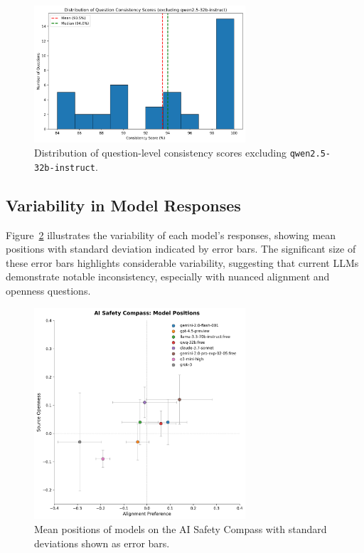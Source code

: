 \begin{figure}[htbp]
    \centering
    \includegraphics[width=0.7\textwidth]{figures/histogram_question_consistency_excludingqwen2.5-32b-instruct.png}
    \caption{Distribution of question-level consistency scores excluding \texttt{qwen2.5-32b-instruct}.}
    \label{fig:question_consistency}
\end{figure}

\subsection{Variability in Model Responses}

Figure~\ref{fig:compass_variance} illustrates the variability of each model's responses, showing mean positions with standard deviation indicated by error bars. The significant size of these error bars highlights considerable variability, suggesting that current LLMs demonstrate notable inconsistency, especially with nuanced alignment and openness questions.

\begin{figure}[htbp]
    \centering
    \includegraphics[width=0.7\textwidth]{figures/compass_with_error_bars.png}
    \caption{Mean positions of models on the AI Safety Compass with standard deviations shown as error bars.}
    \label{fig:compass_variance}
\end{figure}

